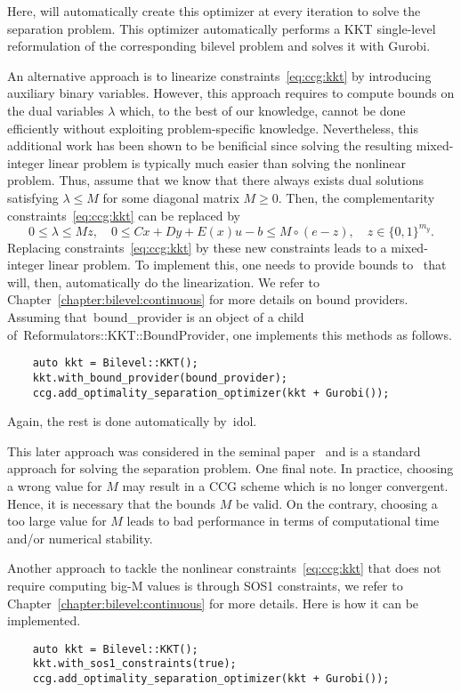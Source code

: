 Here,  will automatically create this optimizer at every iteration
to solve the separation problem. This optimizer automatically performs a KKT
single-level reformulation of the corresponding bilevel problem and solves it
with \textsf{Gurobi}.

An alternative approach is to linearize
constraints~\eqref{eq:ccg:kkt} by introducing auxiliary binary variables.
However, this approach requires to compute bounds on the dual variables
$\lambda$ which, to the best of our knowledge, cannot be done efficiently
without exploiting problem-specific knowledge. Nevertheless, this additional
work has been shown to be benificial since solving the resulting mixed-integer
linear problem is typically much easier than solving the nonlinear problem.
Thus, assume that we know that there always exists dual solutions satisfying
$\lambda \le M$ for some diagonal matrix $M \ge 0$. Then, the complementarity
constraints~\eqref{eq:ccg:kkt} can be replaced by
\begin{equation*}
    0 \le \lambda \le Mz, \quad 
    0 \le Cx + Dy + E(x)u - b \le M\circ(e - z), \quad 
    z\in\{0,1\}^{m_y}.
\end{equation*}
Replacing constraints~\eqref{eq:ccg:kkt} by these new constraints leads to a
mixed-integer linear problem. To implement this, one needs to provide bounds
to~ that will, then, automatically do the linearization. We refer
to Chapter~\ref{chapter:bilevel:continuous} for more details on bound
providers. Assuming that~\textsf{bound\_provider} is an object of a child
of~\textsf{Reformulators::KKT::BoundProvider}, one implements this methods as
follows.
%
\begin{lstlisting}
    auto kkt = Bilevel::KKT();
    kkt.with_bound_provider(bound_provider);
    ccg.add_optimality_separation_optimizer(kkt + Gurobi());
\end{lstlisting}
%
Again, the rest is done automatically by~\textsf{idol}.

This later approach was considered in the seminal paper~\textcite{Zeng2013}
and is a standard approach for solving the separation problem. One final note.
In practice, choosing a wrong value for $M$ may result in a CCG scheme which
is no longer convergent. Hence, it is necessary that the bounds $M$ be valid.
On the contrary, choosing a too large value for $M$ leads to bad performance
in terms of computational time and/or numerical stability. 

Another approach to tackle the nonlinear constraints~\eqref{eq:ccg:kkt} that
does not require computing big-M values is through SOS1 constraints, we refer
to Chapter~\ref{chapter:bilevel:continuous} for more details. Here is how it
can be implemented.
%
\begin{lstlisting}
    auto kkt = Bilevel::KKT();
    kkt.with_sos1_constraints(true);
    ccg.add_optimality_separation_optimizer(kkt + Gurobi());
\end{lstlisting}


